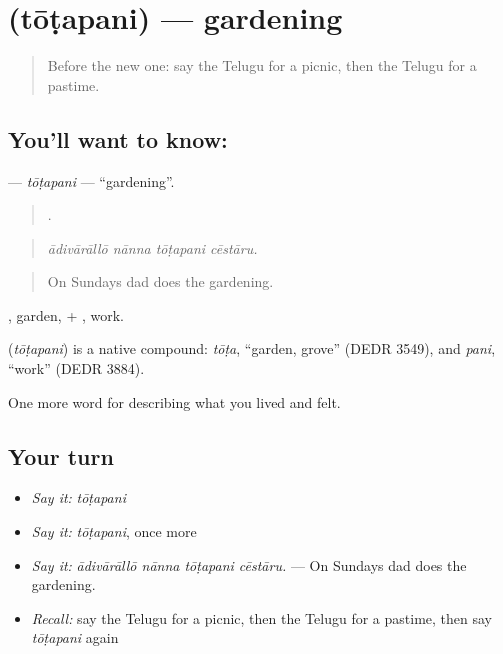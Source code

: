 \section[\texorpdfstring{\te{తోటపని} (tōṭapani)}{తోటపని (tōṭapani)}]{ (tōṭapani) — gardening}

\label{lesson:TE-C536-totapani}



\begin{quote}
Before the new one: say the Telugu for a picnic, then the Telugu for a pastime.
\end{quote}

\subsection*{You'll want to know: }
\textbf{} — \emph{tōṭapani} — \textquotedblleft{}gardening\textquotedblright{}.

\begin{quote}
   .
\end{quote}

\begin{quote}
\emph{ādivārāllō nānna tōṭapani cēstāru.}
\end{quote}

\begin{quote}
On Sundays dad does the gardening.
\end{quote}

, garden, + , work.

\begin{cousinweb}
\textbf{} (\emph{tōṭapani}) is a native compound: \emph{tōṭa}, \textquotedblleft{}garden, grove\textquotedblright{} (DEDR 3549), and \emph{pani}, \textquotedblleft{}work\textquotedblright{} (DEDR 3884).
\end{cousinweb}

\begin{grammarlens}[title={What you've built}]
One more word for describing what you lived and felt.
\end{grammarlens}

\subsection*{Your turn}
\begin{itemize}
\raggedright
  \item \emph{Say it:} \emph{tōṭapani}
  \item \emph{Say it:} \emph{tōṭapani}, once more
  \item \emph{Say it:} \emph{ādivārāllō nānna tōṭapani cēstāru.} — On Sundays dad does the gardening.
  \item \emph{Recall:} say the Telugu for a picnic, then the Telugu for a pastime, then say \emph{tōṭapani} again
\end{itemize}

